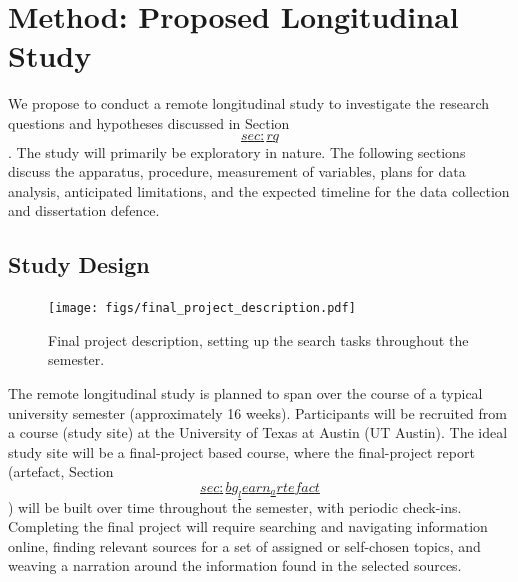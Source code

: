 \documentclass[a4paper, nobind]{templates/ociamthesis}
\begin{document}
\hypertarget{method-proposed-longitudinal-study}{%
\chapter{Method: Proposed Longitudinal Study}\label{method-proposed-longitudinal-study}}

We propose to conduct a remote longitudinal study to investigate the
research questions and hypotheses discussed in Section
\protect\hyperlink{sec:rq}{\[sec:rq\]}. The
study will primarily be exploratory in nature. The following sections
discuss the apparatus, procedure, measurement of variables, plans for
data analysis, anticipated limitations, and the expected timeline for
the data collection and dissertation defence.

\hypertarget{sec:method_exp_design}{%
\section{Study Design}\label{sec:method_exp_design}}

\begin{figure}
\hypertarget{fig_final_project_description}{%
\centering
\texttt{[image: figs/final\_project\_description.pdf]}
\caption{Final project description, setting up the search tasks throughout the
semester.}\label{fig_final_project_description}
}
\end{figure}

The remote longitudinal study is planned to span over the course of a
typical university semester (approximately 16 weeks). Participants will
be recruited from a course (study site) at the University of Texas at
Austin (UT Austin). The ideal study site will be a final-project based
course, where the final-project report (artefact, Section
\protect\hyperlink{sec:bg_learn_artefact}{\[sec:bg_learn_artefact\]}) will be built over time throughout
the semester, with periodic check-ins. Completing the final project will
require searching and navigating information online, finding relevant
sources for a set of assigned or self-chosen topics, and weaving a
narration around the information found in the selected sources.
\end{document}

